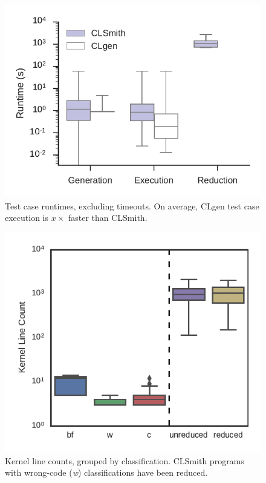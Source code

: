 \begin{figure}
	\centering %
	\includegraphics[width=\columnwidth]{build/img/runtimes}%
	\caption{%
		Test case runtimes, excluding timeouts. On average, CLgen test case execution is $x\times$ faster than CLSmith. %
	}%
	\label{fig:runtimes} %
\end{figure}


\begin{figure}
	\centering %
	\includegraphics[width=\columnwidth]{build/img/kernel-sizes}%
	\caption{%
		Kernel line counts, grouped by classification. CLSmith programs with wrong-code (\emph{w}) classifications have been reduced.%
	}%
	\label{fig:kernel-sizes} %
\end{figure}


